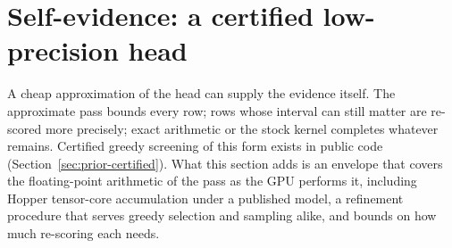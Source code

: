 \section{Self-evidence: a certified low-precision head}\label{sec:selfevidence}
A cheap approximation of the head can supply the evidence itself. The approximate pass bounds every row; rows whose interval can still matter are re-scored more precisely; exact arithmetic or the stock kernel completes whatever remains. Certified greedy screening of this form exists in public code (Section~\ref{sec:prior-certified}). What this section adds is an envelope that covers the floating-point arithmetic of the pass as the GPU performs it, including Hopper tensor-core accumulation under a published model, a refinement procedure that serves greedy selection and sampling alike, and bounds on how much re-scoring each needs.

